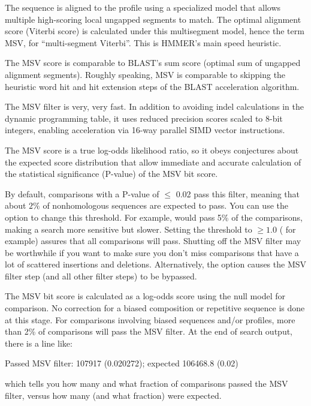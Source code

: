 The sequence is aligned to the profile using a specialized model that
allows multiple high-scoring local ungapped segments to match.  The
optimal alignment score (Viterbi score) is calculated under this
multisegment model, hence the term MSV, for ``multi-segment
Viterbi''. This is HMMER's main speed heuristic.

The MSV score is comparable to BLAST's sum score (optimal sum of
ungapped alignment segments).  Roughly speaking, MSV is comparable to
skipping the heuristic word hit and hit extension steps of the BLAST
acceleration algorithm. 

The MSV filter is very, very fast. In addition to avoiding indel 
calculations in the dynamic programming table, it uses reduced precision
scores scaled to 8-bit integers, enabling acceleration via 16-way       
parallel SIMD vector instructions. 

The MSV score is a true log-odds likelihood ratio, so it obeys
conjectures about the expected score distribution\cite{Eddy08} that
allow immediate and accurate calculation of the statistical
significance (P-value) of the MSV bit score.

By default, comparisons with a P-value of $\leq$ 0.02 pass this
filter, meaning that about $2\%$ of nonhomologous sequences are
expected to pass. You can use the  option to change
this threshold. For example,  would pass 5\% of the
comparisons, making a search more sensitive but slower. Setting the
threshold to $\ge 1.0$ ( for example) assures that all
comparisons will pass. Shutting off the MSV filter may be worthwhile
if you want to make sure you don't miss comparisons that have a lot of
scattered insertions and deletions. Alternatively, the 
option causes the MSV filter step (and all other filter steps) to be
bypassed.

The MSV bit score is calculated as a log-odds score using the null
model for comparison. No correction for a biased composition or
repetitive sequence is done at this stage. For comparisons involving
biased sequences and/or profiles, more than 2\% of comparisons will
pass the MSV filter. At the end of search output, there is a line
like:

\begin{sreoutput}
 Passed MSV filter:                    107917  (0.020272); expected 106468.8 (0.02)
\end{sreoutput}

 which tells you how many and what fraction of comparisons passed the
 MSV filter, versus how many (and what fraction) were expected. 


